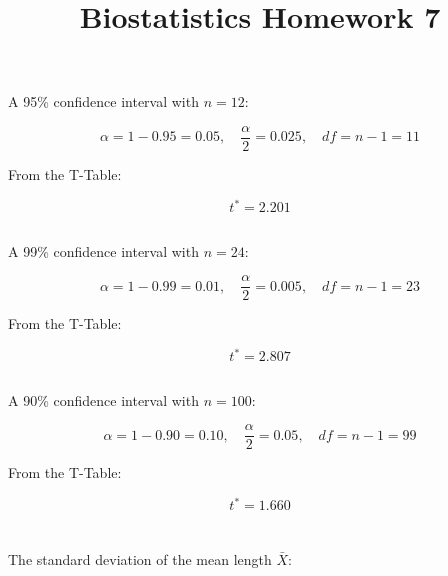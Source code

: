 \documentclass{homework}
\begin{document}
\title{Biostatistics Homework 7}
\author{\chineseName \masterStudentID}
\date{}
\maketitle

\section{}

\subsection{}

A 95\% confidence interval with \( n = 12 \):

\[
\alpha = 1 - 0.95 = 0.05, \quad \frac{\alpha}{2} = 0.025, \quad df = n - 1 = 11
\]

From the T-Table:

\[
t^* = 2.201
\]

\subsection{}

A 99\% confidence interval with \( n = 24 \):

\[
\alpha = 1 - 0.99 = 0.01, \quad \frac{\alpha}{2} = 0.005, \quad df = n - 1 = 23
\]

From the T-Table:

\[
t^* = 2.807
\]

\subsection{}

A 90\% confidence interval with \( n = 100 \):

\[
\alpha = 1 - 0.90 = 0.10, \quad \frac{\alpha}{2} = 0.05, \quad df = n - 1 = 99
\]

From the T-Table:

\[
t^* = 1.660
\]

\section{}

\subsection{}

The standard deviation of the mean length \( \bar{X} \):
\end{document}
